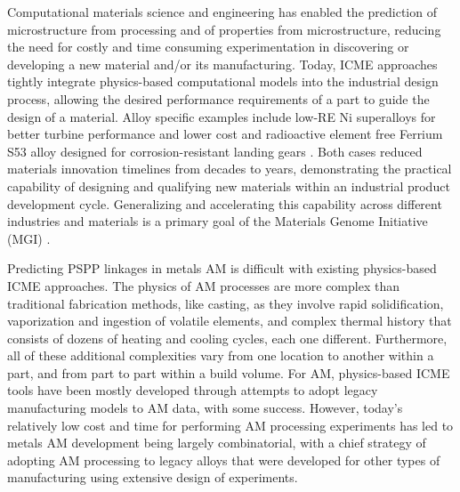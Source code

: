 Computational materials science and engineering has enabled the prediction of microstructure from processing and of properties from microstructure, reducing the need for costly and time consuming experimentation in discovering or developing a new material and/or its manufacturing. Today, ICME approaches tightly integrate physics-based computational models into the industrial design process, allowing the desired performance requirements of a part to guide the design of a material. Alloy specific examples include low-RE Ni superalloys for better turbine performance \cite{Pollock2016} and lower cost and radioactive element free Ferrium S53 alloy designed for corrosion-resistant landing gears \cite{Olson2014}. Both cases reduced materials innovation timelines from decades to years, demonstrating the practical capability of designing and qualifying new materials within an industrial product development cycle. Generalizing and accelerating this capability across different industries and materials is a primary goal of the Materials Genome Initiative (MGI) \cite{MGI}.

Predicting PSPP linkages in metals AM is difficult with existing physics-based ICME approaches. The physics of AM processes are more complex than traditional fabrication methods, like casting, as they involve rapid solidification, vaporization and ingestion of volatile elements, and complex thermal history that consists of dozens of heating and cooling cycles, each one different. Furthermore, all of these additional complexities vary from one location to another within a part, and from part to part within a build volume. For AM, physics-based ICME tools have been mostly developed through attempts to adopt legacy manufacturing models to AM data, with some success. However, today's relatively low cost and time for performing AM processing experiments has led to metals AM development being largely combinatorial, with a chief strategy of adopting AM processing to legacy alloys that were developed for other types of manufacturing using extensive design of experiments.

